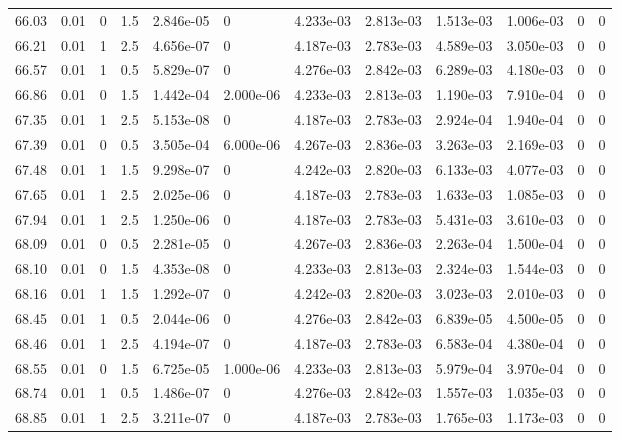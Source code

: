 \documentclass[preview]{standalone}
\begin{document}
{{{{{{{{{{\begin{tabular}{L{1.2cm}C{1.2cm} C{0.3cm}C{0.5cm} C{1.4cm}C{1.4cm} C{1.4cm}C{1.4cm} C{1.6cm}C{1.6cm} C{1.6cm}C{1.6cm}}
  66.03  &  0.01  & 0     & 1.5 &  2.846e-05  & 0  &  4.233e-03&   2.813e-03& 1.513e-03 & 1.006e-03   &  0 & 0  \\ 
  66.21  &  0.01  & 1     & 2.5 &  4.656e-07  & 0  &  4.187e-03&   2.783e-03& 4.589e-03 & 3.050e-03   &  0 & 0  \\ 
  66.57  &  0.01  & 1     & 0.5 &  5.829e-07  & 0  &  4.276e-03&   2.842e-03& 6.289e-03 & 4.180e-03   &  0 & 0  \\ 
  66.86  &  0.01  & 0     & 1.5 &  1.442e-04  & 2.000e-06  &  4.233e-03&   2.813e-03& 1.190e-03 & 7.910e-04   &  0 & 0  \\ 
  67.35  &  0.01  & 1     & 2.5 &  5.153e-08  & 0  &  4.187e-03&   2.783e-03& 2.924e-04 & 1.940e-04   &  0 & 0  \\ 
  67.39  &  0.01  & 0     & 0.5 &  3.505e-04  & 6.000e-06  &  4.267e-03&   2.836e-03& 3.263e-03 & 2.169e-03   &  0 & 0  \\ 
  67.48  &  0.01  & 1     & 1.5 &  9.298e-07  & 0  &  4.242e-03&   2.820e-03& 6.133e-03 & 4.077e-03   &  0 & 0  \\ 
  67.65  &  0.01  & 1     & 2.5 &  2.025e-06  & 0  &  4.187e-03&   2.783e-03& 1.633e-03 & 1.085e-03   &  0 & 0  \\ 
  67.94  &  0.01  & 1     & 2.5 &  1.250e-06  & 0  &  4.187e-03&   2.783e-03& 5.431e-03 & 3.610e-03   &  0 & 0  \\ 
  68.09  &  0.01  & 0     & 0.5 &  2.281e-05  & 0  &  4.267e-03&   2.836e-03& 2.263e-04 & 1.500e-04   &  0 & 0  \\ 
  68.10  &  0.01  & 0     & 1.5 &  4.353e-08  & 0  &  4.233e-03&   2.813e-03& 2.324e-03 & 1.544e-03   &  0 & 0  \\ 
  68.16  &  0.01  & 1     & 1.5 &  1.292e-07  & 0  &  4.242e-03&   2.820e-03& 3.023e-03 & 2.010e-03   &  0 & 0  \\ 
  68.45  &  0.01  & 1     & 0.5 &  2.044e-06  & 0  &  4.276e-03&   2.842e-03& 6.839e-05 & 4.500e-05   &  0 & 0  \\ 
  68.46  &  0.01  & 1     & 2.5 &  4.194e-07  & 0  &  4.187e-03&   2.783e-03& 6.583e-04 & 4.380e-04   &  0 & 0  \\ 
  68.55  &  0.01  & 0     & 1.5 &  6.725e-05  & 1.000e-06  &  4.233e-03&   2.813e-03& 5.979e-04 & 3.970e-04   &  0 & 0  \\ 
  68.74  &  0.01  & 1     & 0.5 &  1.486e-07  & 0  &  4.276e-03&   2.842e-03& 1.557e-03 & 1.035e-03   &  0 & 0  \\ 
  68.85  &  0.01  & 1     & 2.5 &  3.211e-07  & 0  &  4.187e-03&   2.783e-03& 1.765e-03 & 1.173e-03   &  0 & 0  \\ 

\end{tabular}}}}}}}}}}}
\end{document}
